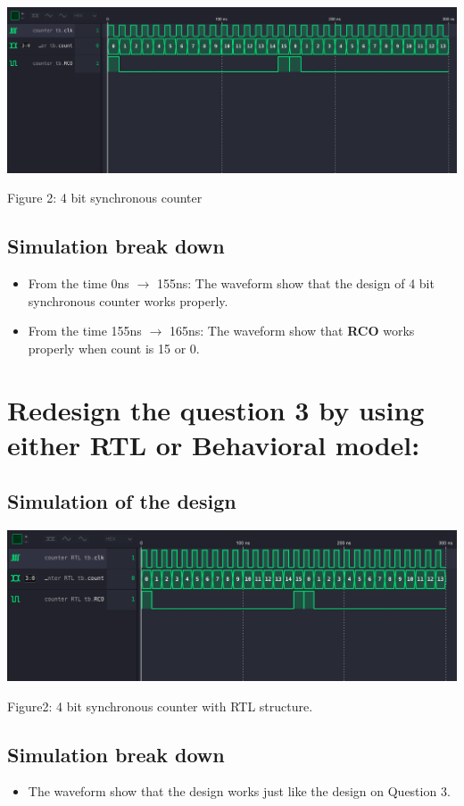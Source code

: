 \documentclass [12pt] {article}
\begin{document}
			\centerline{\includegraphics[scale = 0.35]{counter.png}}
			\centerline{Figure 2: 4 bit synchronous counter} 

		\subsection {Simulation break down}
			\begin {itemize}
				\item From the time 0ns $\rightarrow$ 155ns: The waveform show that the design of 4 bit synchronous counter works properly.
				\item From the time 155ns $\rightarrow$ 165ns: The waveform show that \textbf{RCO} works properly when count is 15 or 0.
			\end {itemize}
		 
		 \section{Redesign the question 3 by using either RTL or Behavioral model:}
		
		\subsection {Simulation of the design}		
		
			\centerline{\includegraphics[scale = 0.35]{counter_RTL.png}}
			\centerline{Figure2: 4 bit synchronous counter with RTL structure.} 

		\subsection {Simulation break down}
			\begin {itemize}
				\item The waveform show that the design works just like the design on Question 3.
			\end {itemize}
		
\end{document}
